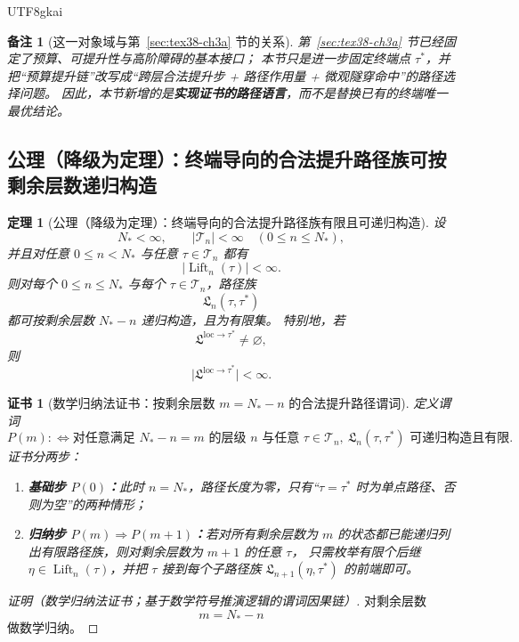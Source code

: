 \documentclass[12pt]{article}
\newtheorem{theorem}{定理}[section]
\newtheorem{remark}{备注}[section]
\newtheorem{Certificate}{证书}[section]
\newcommand{\Lift}{\operatorname{Lift}}
\begin{document}
\begin{CJK*}{UTF8}{gkai}
\begin{remark}[这一对象域与第~\ref{sec:tex38-ch3a} 节的关系]
第~\ref{sec:tex38-ch3a} 节已经固定了预算、可提升性与高阶障碍的基本接口；
本节只是进一步固定终端点 $\tau^\ast$，并把“预算提升链”改写成“跨层合法提升步 + 路径作用量 + 微观隧穿命中”的路径选择问题。
因此，本节新增的是\textbf{实现证书的路径语言}，而不是替换已有的终端唯一最优结论。
\end{remark}

\subsection{公理（降级为定理）：终端导向的合法提升路径族可按剩余层数递归构造}
\label{subsec:tex38-liftpath-finite}

\begin{theorem}[公理（降级为定理）：终端导向的合法提升路径族有限且可递归构造]
\label{thm:tex38-liftpath-finite}
设
\[
  N_\ast<\infty,
  \qquad
  |\mathcal T_n|<\infty
  \quad
  (0\le n\le N_\ast),
\]
并且对任意 $0\le n<N_\ast$ 与任意 $\tau\in\mathcal T_n$ 都有
\[
  |\Lift_n(\tau)|<\infty.
\]
则对每个 $0\le n\le N_\ast$ 与每个 $\tau\in\mathcal T_n$，路径族
\[
  \mathfrak L_n(\tau,\tau^\ast)
\]
都可按剩余层数 $N_\ast-n$ 递归构造，且为有限集。
特别地，若
\[
  \mathfrak L^{\mathrm{loc}\to\tau^\ast}\neq\varnothing,
\]
则
\[
  \bigl|\mathfrak L^{\mathrm{loc}\to\tau^\ast}\bigr|<\infty.
\]
\end{theorem}

\begin{Certificate}[数学归纳法证书：按剩余层数 $m=N_\ast-n$ 的合法提升路径谓词]
\label{cert:tex38-liftpath-finite}
定义谓词
\[
  P(m)
  :
  \Longleftrightarrow
  \text{对任意满足 }N_\ast-n=m\text{ 的层级 }n\text{ 与任意 }\tau\in\mathcal T_n,\
  \mathfrak L_n(\tau,\tau^\ast)\text{ 可递归构造且有限}.
\]
证书分两步：
\begin{enumerate}
  \item \textbf{基础步 $P(0)$：}此时 $n=N_\ast$，路径长度为零，只有“$\tau=\tau^\ast$ 时为单点路径、否则为空”的两种情形；
  \item \textbf{归纳步 $P(m)\Rightarrow P(m+1)$：}若对所有剩余层数为 $m$ 的状态都已能递归列出有限路径族，则对剩余层数为 $m+1$ 的任意 $\tau$，
  只需枚举有限个后继 $\eta\in\Lift_n(\tau)$，并把 $\tau$ 接到每个子路径族 $\mathfrak L_{n+1}(\eta,\tau^\ast)$ 的前端即可。
\end{enumerate}
\end{Certificate}

\begin{proof}[证明（数学归纳法证书；基于数学符号推演逻辑的谓词因果链）]
对剩余层数
\[
  m=N_\ast-n
\]
做数学归纳。


\end{proof}
\end{CJK*}
\end{document}
